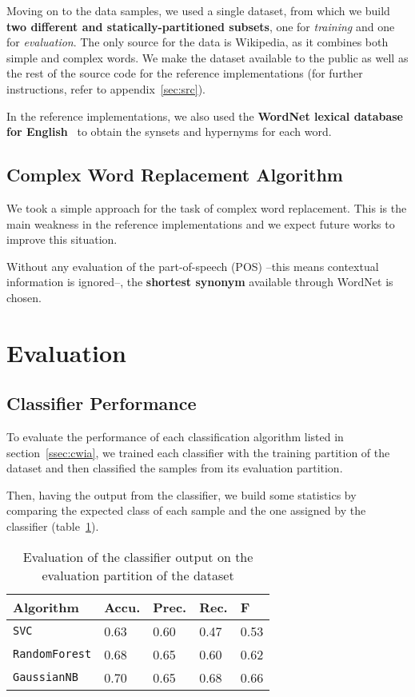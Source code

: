 \documentclass[11pt,a4paper]{article}
\begin{document}
Moving on to the data samples, we used a single dataset, from which we build \textbf{two different and statically-partitioned subsets}, one for \emph{training} and one for \emph{evaluation}. The only source for the data is Wikipedia, as it combines both simple and complex words. We make the dataset available to the public as well as the rest of the source code for the reference implementations (for further instructions, refer to appendix~\ref{sec:src}).

In the reference implementations, we also used the \textbf{WordNet lexical database for English}~\cite{miller1995wordnet} to obtain the synsets and hypernyms for each word.

\subsection{Complex Word Replacement Algorithm}

We took a simple approach for the task of complex word replacement. This is the main weakness in the reference implementations and we expect future works to improve this situation.

Without any evaluation of the part-of-speech (POS) –this means contextual information is ignored–, the \textbf{shortest synonym} available through WordNet is chosen.

\section{Evaluation}
\label{sec:eval}

\subsection{Classifier Performance}

To evaluate the performance of each classification algorithm listed in section~\ref{ssec:cwia}, we trained each classifier with the training partition of the dataset and then classified the samples from its evaluation partition. 

Then, having the output from the classifier, we build some statistics by comparing the expected class of each sample and the one assigned by the classifier (table~\ref{tab:eval}).

\begin{table}
	\centering
	\small
	\begin{tabular}{|l|l|l|l|l|}
		\hline
		{\bf Algorithm} & {\bf Accu.} & {\bf Prec.} & {\bf Rec.} & {\bf F}\\\hline
		\verb|SVC| & {0.63} & {0.60} & {0.47} & {0.53} \\
		\verb|RandomForest| & {0.68} & {0.65} & {0.60} & {0.62} \\
		\verb|GaussianNB| & {0.70} & {0.65} & {0.68} & {0.66} \\\hline
	\end{tabular}
	\caption{Evaluation of the classifier output on the evaluation partition of the dataset}\label{tab:eval}
\end{table}
\end{document}
